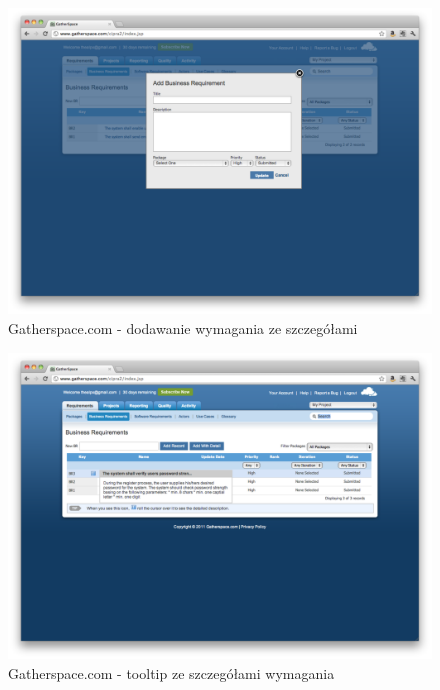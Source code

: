       \begin{figure}[t]
        \centering
        \includegraphics[width=1.0\textwidth]{img/gatherspace_5.pdf}
        \caption{Gatherspace.com - dodawanie wymagania ze szczegółami}
        \label{fig:gatherspace_5}
      \end{figure}

      \begin{figure}[t]
        \centering
        \includegraphics[width=1.0\textwidth]{img/gatherspace_6.pdf}
        \caption{Gatherspace.com - tooltip ze szczegółami wymagania}
        \label{fig:gatherspace_6}
      \end{figure}

